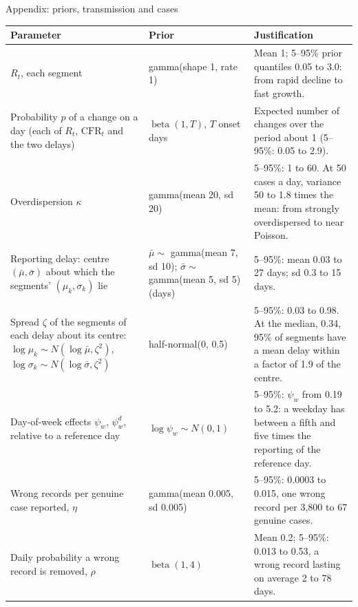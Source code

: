 \documentclass[aspectratio=169,9pt]{beamer}
\newcommand{\cfr}{\mathrm{CFR}}
\begin{document}
\begin{frame}{Appendix: priors, transmission and cases}
\begin{center}
\footnotesize
\renewcommand{\arraystretch}{1.15}
\begin{tabular}{p{}p{}p{}}
\toprule
Parameter & Prior & Justification \\
\midrule
$R_t$, each segment & gamma(shape 1, rate 1) & Mean 1; 5--95\% prior quantiles 0.05 to 3.0: from rapid decline to fast growth. \\
Probability $p$ of a change on a day (each of $R_t$, $\cfr_t$ and the two delays) & $\operatorname{beta}(1,T)$, $T$ onset days & Expected number of changes over the period about 1 (5--95\%: 0.05 to 2.9). \\
Overdispersion $\kappa$ & gamma(mean 20, sd 20) & 5--95\%: 1 to 60. At 50 cases a day, variance 50 to 1.8 times the mean: from strongly overdispersed to near Poisson. \\
Reporting delay: centre $(\bar\mu,\bar\sigma)$ about which the segments' $(\mu_k,\sigma_k)$ lie & $\bar\mu\sim$ gamma(mean 7, sd 10); $\bar\sigma\sim$ gamma(mean 5, sd 5) (days) & 5--95\%: mean 0.03 to 27 days; sd 0.3 to 15 days. \\
Spread $\zeta$ of the segments of each delay about its centre: $\log\mu_k\sim N(\log\bar\mu,\zeta^2)$, $\log\sigma_k\sim N(\log\bar\sigma,\zeta^2)$ & half-normal(0, 0.5) & 5--95\%: 0.03 to 0.98. At the median, 0.34, 95\% of segments have a mean delay within a factor of 1.9 of the centre. \\
Day-of-week effects $\psi_w$, $\psi^{d}_w$, relative to a reference day & $\log\psi_w\sim N(0,1)$ & 5--95\%: $\psi_w$ from 0.19 to 5.2: a weekday has between a fifth and five times the reporting of the reference day. \\
Wrong records per genuine case reported, $\eta$ & gamma(mean 0.005, sd 0.005) & 5--95\%: 0.0003 to 0.015, one wrong record per 3{,}800 to 67 genuine cases. \\
Daily probability a wrong record is removed, $\rho$ & $\operatorname{beta}(1,4)$ & Mean 0.2; 5--95\%: 0.013 to 0.53, a wrong record lasting on average 2 to 78 days. \\
\bottomrule
\end{tabular}
\end{center}
\end{frame}
\end{document}
